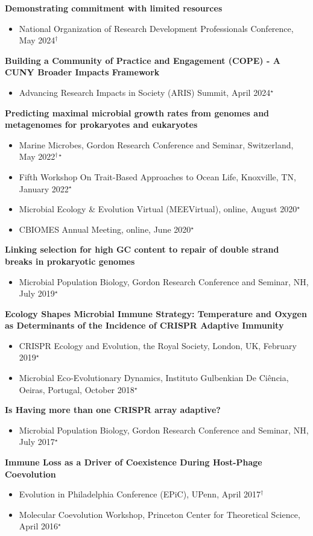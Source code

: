 \documentclass[]{res}
\begin{document}
\begin{resume}
 {\bf Demonstrating commitment with limited resources}
 \begin{itemize}
 \item National Organization of Research Development Professionals Conference, May 2024$^{\dagger}$
 \end{itemize} 
 
 {\bf Building a Community of Practice and Engagement (COPE) - A CUNY Broader Impacts Framework}
 \begin{itemize}
 \item Advancing Research Impacts in Society (ARIS) Summit, April 2024$^{\star}$
 \end{itemize}
 
 {\bf Predicting maximal microbial growth rates from genomes and metagenomes for prokaryotes and eukaryotes}
 \begin{itemize}
 \item Marine Microbes, Gordon Research Conference and Seminar, Switzerland, May 2022$^{\dagger\star}$
 \item Fifth Workshop On Trait-Based Approaches to Ocean Life, Knoxville, TN, January 2022$^{\star}$
 \item Microbial Ecology \& Evolution Virtual (MEEVirtual), online, August 2020$^{\star}$
 \item CBIOMES Annual Meeting, online, June 2020$^{\star}$
 \end{itemize}
 
{\bf Linking selection for high GC content to repair of double strand breaks in prokaryotic genomes}
 \begin{itemize}
 \item Microbial Population Biology, Gordon Research Conference and Seminar, NH, July 2019$^{\star}$
 \end{itemize} 
 
{\bf Ecology Shapes Microbial Immune Strategy: Temperature and Oxygen as Determinants of the Incidence of CRISPR Adaptive Immunity} 
 \begin{itemize}
 \item CRISPR Ecology and Evolution, the Royal Society, London, UK, February 2019$^{\star}$
 \item Microbial Eco-Evolutionary Dynamics, Instituto Gulbenkian De Ci\^{e}ncia, Oeiras, Portugal, October 2018$^{\star}$
 \end{itemize}
 
 {\bf Is Having more than one CRISPR array adaptive?}
 \begin{itemize}
 \item Microbial Population Biology, Gordon Research Conference and Seminar, NH, July 2017$^{\star}$
 \end{itemize}
 
  {\bf Immune Loss as a Driver of Coexistence During Host-Phage Coevolution}
 \begin{itemize}
 \item Evolution in Philadelphia Conference (EPiC), UPenn, April 2017$^{\dagger}$
 \item Molecular Coevolution Workshop, Princeton Center for Theoretical Science, April 2016$^{\star}$
 \end{itemize}


\end{resume} 
\end{document}
